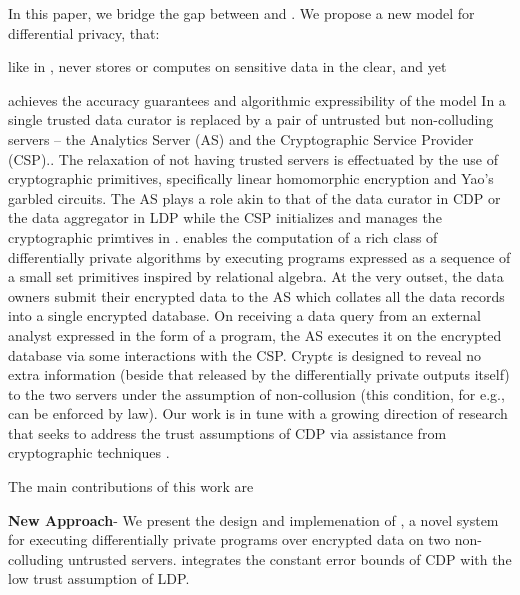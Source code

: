 In this paper, we bridge the gap between \ldp and \cdp. We propose a new model for differential privacy, \system that: 
\squishlist
\item like in \ldp, never stores or computes on sensitive data in the clear, and yet
\item achieves the accuracy guarantees and algorithmic expressibility of the \cdp model \squishend 
In \system a single trusted data curator is replaced by a pair of untrusted but non-colluding servers -- the Analytics Server (\textsf{AS}) and the Cryptographic Service Provider (\textsf{CSP}).\cite{Boneh1,Boneh2,Ridge2,Matrix2,secureML,LReg,Ver}. The relaxation of not having trusted servers is effectuated by the use of cryptographic primitives, specifically linear homomorphic encryption and Yao's garbled circuits. The \textsf{AS} plays a role akin to that of the data curator in \textsf{CDP} or the data aggregator in \textsf{LDP} while the \textsf{CSP} initializes and manages the cryptographic primtives in \system. \system enables the computation of a rich class of differentially private algorithms by executing programs expressed as a sequence of a small set \system primitives inspired by relational algebra. At the very outset, the data owners submit their encrypted data to the \textsf{AS} which collates all the data records into a single encrypted database.  On receiving a data query from an external analyst expressed in the form of a \system program, the \textsf{AS} executes it on the encrypted database via some interactions with the \textsf{CSP}.  Crypt$\epsilon$ is designed to reveal no extra information (beside that released by the differentially private outputs itself) to
the two servers under the assumption of  non-collusion (this condition, for e.g., can be enforced by law).  Our work is in tune with a growing direction of research that seeks to address the trust assumptions of \textsf{CDP} via assistance from cryptographic techniques \cite{Prochlo,mixnets,amplification,Shi,Shi2,kamara,Rastogi}.
\par The main contributions of this work are
\squishlist
	\item \textbf{New Approach}- We present the design and implemenation of \system, a novel system for executing differentially private programs over encrypted data on two non-colluding untrusted servers. \system integrates the constant error bounds of \textsf{CDP} with the low trust assumption of \textsf{LDP}.

